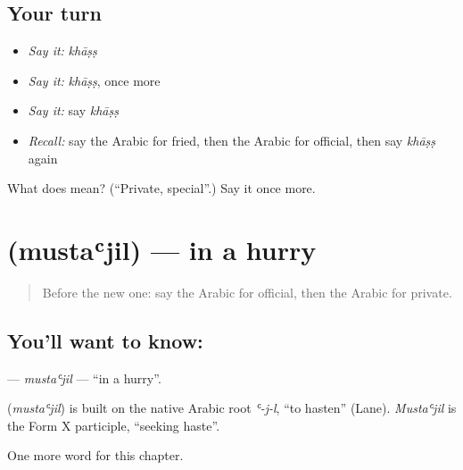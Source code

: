 \subsection*{Your turn}
\begin{itemize}
\raggedright
  \item \emph{Say it:} \emph{khāṣṣ}
  \item \emph{Say it:} \emph{khāṣṣ}, once more
  \item \emph{Say it:} say \emph{khāṣṣ}
  \item \emph{Recall:} say the Arabic for fried, then the Arabic for official, then say \emph{khāṣṣ} again
\end{itemize}

\begin{tcolorbox}[breakable,colback=teal!4,colframe=teal!35!black,title={Before you move on}]
What does  mean? (\textquotedblleft{}Private, special\textquotedblright{}.) Say it once more.
\end{tcolorbox}
\section[\texorpdfstring{\ar{مستعجل} (mustaʿjil)}{مستعجل (mustaʿjil)}]{ (mustaʿjil) — in a hurry}

\label{lesson:AR-C178-mustajil}



\begin{quote}
Before the new one: say the Arabic for official, then the Arabic for private.
\end{quote}

\subsection*{You'll want to know: }
\textbf{} — \emph{mustaʿjil} — \textquotedblleft{}in a hurry\textquotedblright{}.

\begin{cousinweb}
\textbf{} (\emph{mustaʿjil}) is built on the native Arabic root \emph{ʿ-j-l}, \textquotedblleft{}to hasten\textquotedblright{} (Lane). \emph{Mustaʿjil} is the Form X participle, \textquotedblleft{}seeking haste\textquotedblright{}.
\end{cousinweb}

\begin{grammarlens}[title={What you've built}]
One more word for this chapter.
\end{grammarlens}

